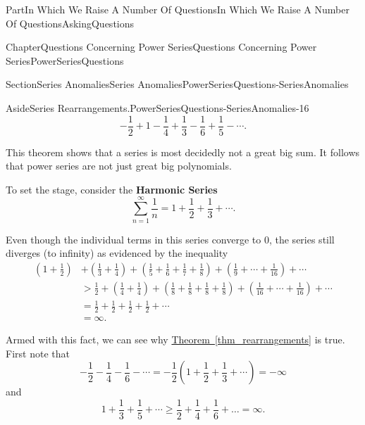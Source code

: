 \documentclass[oneside,10pt,]{book}
\newcommand{\xreffont}{\relax}
\newcommand{\terminology}[1]{\textbf{#1}}
\numberwithin{equation}{part}
\newcommand{\amp}{&}
\begin{document}
\begin{partptx}{Part}{In Which We Raise A Number Of Questions}{}{In Which We Raise A Number Of Questions}{}{}{AskingQuestions}
\begin{chapterptx}{Chapter}{Questions Concerning Power Series}{}{Questions Concerning Power Series}{}{}{PowerSeriesQuestions}
\begin{sectionptx}{Section}{Series Anomalies}{}{Series Anomalies}{}{}{PowerSeriesQuestions-SeriesAnomalies}
\begin{aside}{Aside}{Series Rearrangements.}{PowerSeriesQuestions-SeriesAnomalies-16}
\begin{equation*}
-\frac{1}{2}+1-\frac{1}{4}+\frac{1}{3}-\frac{1}{6}+\frac{1}{5}-\cdots{}\text{.}
\end{equation*}
%
\end{aside}
This theorem shows that a series is most decidedly not a great big sum.  It follows that power series are not just great big polynomials.%
\par
{} To set the stage, consider the \terminology{Harmonic Series}%
\begin{equation}
\sum_{n=1}^\infty\frac{1}{n}=1+\frac{1}{2}+\frac{1}{3}+\cdots\text{.}\label{EQUATIONHarmonicSeries}
\end{equation}
%
\par
Even though the individual terms in this series converge to \(0\), the series still diverges (to infinity) as evidenced by the inequality%
\begin{align*}
\left(1+\frac{1}{2}\right)\amp +\left(\frac{1}{3}+\frac{1}{4}\right)+\left(\frac{1}{5}+\frac{1}{6}+ \frac{1}{7}+\frac{1}{8}\right)+\left(\frac{1}{9}+\cdots+\frac{1}{16}\right)+\cdots\\
\amp >\frac{1}{2}+\left(\frac{1}{4}+\frac{1}{4}\right)+\left(\frac{1}{8}+ \frac{1}{8}+\frac{1}{8}+\frac{1}{8}\right)+\left(\frac{1}{16}+\cdots+\frac{1}{16}\right)+\cdots\\
\amp =\frac{1}{2}+\frac{1}{2}+\frac{1}{2}+\frac{1}{2}+\cdots\\
\amp =   \infty\text{.}
\end{align*}
%
\par
Armed with this fact, we can see why \hyperref[thm_rearrangements]{Theorem~{\xreffont\ref{thm_rearrangements}}} is true. First note that%
\begin{equation*}
-\frac{1}{2}-\frac{1}{4}-\frac{1}{6}-\cdots=-\frac{1}{2}(1+\frac{1}{2}+ \frac{1}{3}+\cdots)=-\infty
\end{equation*}
and%
\begin{equation*}
1+\frac{1}{3}+\frac{1}{5}+\cdots\geq\frac{1}{2}+\frac{1}{4}+\frac{1}{6}+\ldots= \infty\text{.}
\end{equation*}
%
\par

\end{sectionptx}
\end{chapterptx}
\end{partptx}
\end{document}
